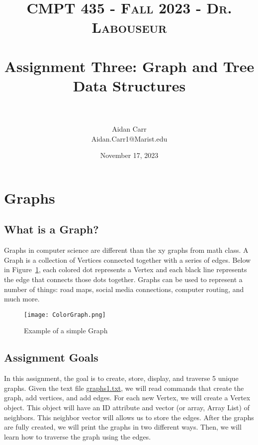 \documentclass[letterpaper, 10pt,DIV=13]{scrartcl}
\title{	
   \normalfont \normalsize 
   \textsc{CMPT 435 - Fall 2023 - Dr. Labouseur} \\[10pt] %
   \horrule{0.5pt} \\[0.25cm] 	%
   \huge Assignment Three: Graph and Tree Data Structures  \\     	    %
   \horrule{0.5pt} \\[0.25cm] 	%
}
\author{Aidan Carr \\ \normalsize Aidan.Carr1@Marist.edu}
\date{\normalsize November 17, 2023} 	%
\numberwithin{equation}{section} %
\numberwithin{figure}{section} %
\numberwithin{table}{section} %
\begin{document}
\maketitle %

\section{Graphs}

\subsection{What is a Graph?}
Graphs in computer science are different than the xy graphs from math class. A Graph is a collection of Vertices connected together with a series of edges. Below in Figure~\ref{figure:ColorGraph}, each colored dot represents a Vertex and each black line represents the edge that connects those dots together. Graphs can be used to represent a number of things: road maps, social media connections, computer routing, and much more.

\begin{figure}[h] 
    \centering 
    \texttt{[image: ColorGraph.png]}
    \caption{Example of a simple Graph\footnotemark}
    \label{figure:ColorGraph}
    
\end{figure}


\subsection{Assignment Goals}
In this assignment, the goal is to create, store, display, and traverse 5 unique graphs. Given the text file \href{https://www.labouseur.com/courses/algorithms/graphs1.txt}{graphs1.txt}, we will read commands that create the graph, add vertices, and add edges. For each new Vertex, we will create a Vertex object. This object will have an ID attribute and vector (or array, Array List) of neighbors. This neighbor vector will allows us to store the edges. After the graphs are fully created, we will print the graphs in two different ways. Then, we will learn how to traverse the graph using the edges.
\end{document}

